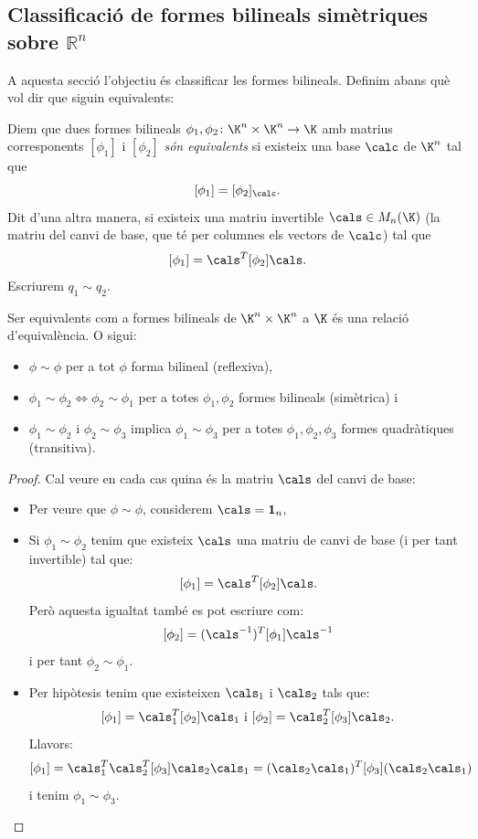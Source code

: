 \subsection{Classificació de formes bilineals simètriques sobre \texorpdfstring{$\mathbb{R}^n$}{Rn}}
A aquesta secció l'objectiu és classificar les formes bilineals. Definim abans què vol dir que siguin equivalents:
\begin{definicio}
Diem que dues formes bilineals $\phi_1,\phi_2\colon \K^n\times\K^n\to \K$ amb matrius corresponents $[\phi_1]$ i $[\phi_2]$ \emph{són equivalents} si existeix una base $\calc$ de $\K^n$ tal que
\[
[\phi_1]=[\phi_2]_\calc .
\]
Dit d'una altra manera, si existeix una matriu invertible $\cals\in M_n(\K)$ (la matriu del canvi de base, que té per columnes els vectors de $\calc$) tal que
\[
[\phi_1]=\cals^T [\phi_2] \cals.
\]
Escriurem $q_1\sim q_2$.
\end{definicio}
\begin{lema}
Ser equivalents com a formes bilineals de $\K^n\times \K^n$ a $\K$ és una relació d'equivalència. O sigui:
\begin{itemize}
    \item $\phi \sim \phi$ per a tot $\phi$ forma bilineal (reflexiva),
    \item $\phi_1\sim \phi_2 \Leftrightarrow \phi_2 \sim \phi_1$ per a totes $\phi_1, \phi_2$ formes bilineals (simètrica) i
    \item $\phi_1\sim \phi_2$ i $\phi_2\sim \phi_3$ implica $\phi_1\sim \phi_3$ per a totes $\phi_1,\phi_2,\phi_3$ formes quadràtiques (transitiva).
\end{itemize}
\end{lema}
\begin{proof}
Cal veure en cada cas quina és la matriu $\cals$ del canvi de base:
\begin{itemize}
    \item Per veure que $\phi\sim \phi$, considerem $\cals=\1_n$,
    \item Si $\phi_1\sim \phi_2$ tenim que existeix $\cals$ una matriu de canvi de base (i per tant invertible) tal que:
    \[
    [\phi_1]=\cals^T [\phi_2] \cals.
    \]
    Però aquesta igualtat també es pot escriure com:
    \[
    [\phi_2]=(\cals^{-1})^T [\phi_1] \cals^{-1}
    \]
    i per tant $\phi_2\sim \phi_1$.
    \item Per hipòtesis tenim que existeixen $\cals_1$ i $\cals_2$ tals que:
    \[
    [\phi_1]=\cals_1^T [\phi_2] \cals_1
    \text{ i }
    [\phi_2]=\cals_2^T [\phi_3] \cals_2.
    \]
    Llavors:
    \[
    [\phi_1]=\cals_1^T \cals_2^T [\phi_3] \cals_2 \cals_1=
    (\cals_2 \cals_1)^T [\phi_3] (\cals_2 \cals_1)
    \]
    i tenim $\phi_1\sim \phi_3$.
\end{itemize}
\end{proof}

